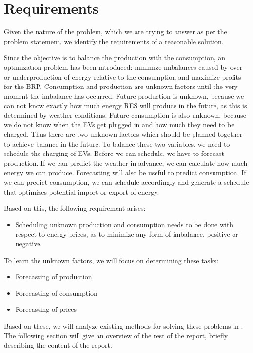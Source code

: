 \section{Requirements}\label{sec:requirements}
Given the nature of the problem, which we are trying to answer as per the problem statement, we identify the requirements of a reasonable solution.

Since the objective is to balance the production with the consumption, an optimization problem has been introduced: minimize imbalances caused by over- or underproduction of energy relative to the consumption and maximize profits for the BRP. Consumption and production are unknown factors until the very moment the imbalance has occurred. Future production is unknown, because we can not know exactly how much energy RES will produce in the future, as this is determined by weather conditions. Future consumption is also unknown, because we do not know when the EVs get plugged in and how much they need to be charged. Thus there are two unknown factors which should be planned together to achieve balance in the future. To balance these two variables, we need to schedule the charging of EVs. Before we can schedule, we have to forecast production. If we can predict the weather in advance, we can calculate how much energy we can produce. Forecasting will also be useful to predict consumption. If we can predict consumption, we can schedule accordingly and generate a schedule that optimizes potential import or export of energy. 

Based on this, the following requirement arises:
\begin{itemize}
  \item Scheduling unknown production and consumption needs to be done with respect to energy prices, as to minimize any form of imbalance, positive or negative.
\end{itemize}

To learn the unknown factors, we will focus on determining these tasks:
\begin{itemize}
  \item Forecasting of production
  \item Forecasting of consumption
  \item Forecasting of prices
\end{itemize}

Based on these, we will analyze existing methods for solving these problems in . The following section will give an overview of the rest of the report, briefly describing the content of the report. 
